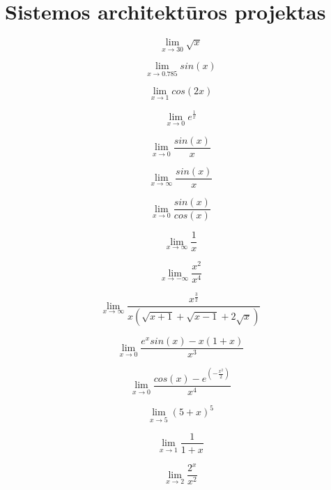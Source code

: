 \section{Sistemos architektūros projektas}

\[ \lim_{x \to 30} \sqrt{x} \]

\[ \lim_{x \to 0.785} sin(x) \]

\[ \lim_{x \to 1} cos(2x) \]

\[ \lim_{x \to 0} e^{\frac{1}{x}} \]

\[ \lim_{x \to 0} \frac{sin(x)}{x} \]

\[ \lim_{x \to \infty} \frac{sin(x)}{x} \]

\[ \lim_{x \to 0} \frac{sin(x)}{cos(x)} \]

\[ \lim_{x \to \infty} \frac{1}{x} \]

\[ \lim_{x \to -\infty} \frac{x^2}{x^4} \]

\[ \lim_{x \to \infty} \frac{x^{\frac{3}{2}}}{x(\sqrt{x+1}+\sqrt{x-1}+2\sqrt{x})} \]

\[ \lim_{x \to 0} \frac{e^xsin(x)-x(1+x)}{x^3} \]

\[ \lim_{x \to 0} \frac{cos(x)-e^{(-\frac{x^2}{2})}}{x^4} \]

\[ \lim_{x \to 5} (5+x)^5 \]

\[ \lim_{x \to 1} \frac{1}{1+x} \]

\[ \lim_{x \to 2} \frac{2^x}{x^2} \]
